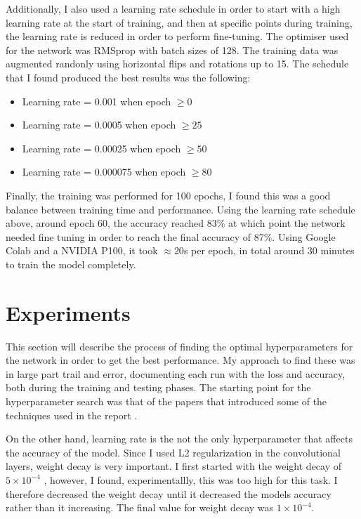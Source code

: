 \documentclass[12pt]{article}
\begin{document}
Additionally, I also used a learning rate schedule in order to start with a high learning rate at the start of training, and then at specific points during training, the learning rate is reduced in order to perform fine-tuning. The optimiser used for the network was RMSprop with batch sizes of 128. The training data was augmented randonly using horizontal flips and rotations up to 15\degree. The schedule that I found produced the best results was the following:

\begin{itemize}
  \item Learning rate = 0.001 when epoch $\geq 0$
  \item Learning rate = 0.0005 when epoch $\ge 25$
  \item Learning rate = 0.00025 when epoch $\ge 50$
  \item Learning rate = 0.000075 when epoch $\ge 80$
\end{itemize}

Finally, the training was performed for 100 epochs, I found this was a good balance between training time and performance. Using the learning rate schedule above, around epoch 60, the accuracy reached 83\% at which point the network needed fine tuning in order to reach the final accuracy of 87\%. Using Google Colab and a NVIDIA P100, it took $\approx 20$s per epoch, in total around 30 minutes to train the model completely.

\section{Experiments}
This section will describe the process of finding the optimal hyperparameters for the network in order to get the best performance. My approach to find these was in large part trail and error, documenting each run with the loss and accuracy, both during the training and testing phases. The starting point for the hyperparameter search was that of the papers that introduced some of the techniques used in the report \cite{simonyan2014deep}.

On the other hand, learning rate is the not the only hyperparameter that affects the accuracy of the model. Since I used L2 regularization in the convolutional layers, weight decay is very important. I first started with the weight decay of $5\times 10^{-4}$ \cite{simonyan2014deep}, however, I found, experimentallly, this was too high for this task. I therefore decreased the weight decay until it decreased the models accuracy rather than it increasing. The final value for weight decay was $1\times 10^{-4}$.
\end{document}
